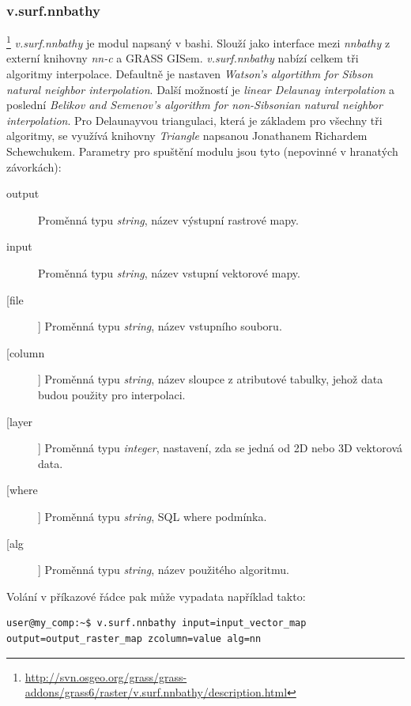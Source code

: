 \documentclass[12pt,a4paper]{article}
\begin{document}
\subsubsection{v.surf.nnbathy}\footnote{\url{http://svn.osgeo.org/grass/grass-addons/grass6/raster/v.surf.nnbathy/description.html}}
\emph{v.surf.nnbathy} je modul napsaný v bashi. Slouží jako interface mezi \emph{nnbathy} z externí knihovny \emph{nn-c} a GRASS GISem. \emph{v.surf.nnbathy} nabízí celkem tři algoritmy interpolace. Defaultně je nastaven \emph{Watson's algortithm for Sibson natural neighbor interpolation}. Další možností je \emph{linear Delaunay interpolation} a poslední \emph{Belikov and Semenov's algorithm for	non-Sibsonian natural neighbor interpolation}. Pro Delaunayvou triangulaci, která je základem pro všechny tři algoritmy, se využívá knihovny \emph{Triangle} napsanou Jonathanem Richardem Schewchukem. Parametry pro spuštění modulu jsou tyto (nepovinné v hranatých závorkách):
\begin{description}
\item[output] Proměnná typu \emph{string}, název výstupní rastrové mapy.
\item[input] Proměnná typu \emph{string}, název vstupní vektorové mapy.
\item[[file]] Proměnná typu \emph{string}, název vstupního souboru.
\item[[column]] Proměnná typu \emph{string}, název sloupce z atributové tabulky, jehož data budou použity pro interpolaci.
\item[[layer]] Proměnná typu \emph{integer}, nastavení, zda se jedná od 2D nebo 3D vektorová data.
\item[[where]] Proměnná typu \emph{string}, SQL where podmínka.
\item[[alg]] Proměnná typu \emph{string}, název použitého algoritmu.
\end{description}

\bigskip

Volání v příkazové řádce pak může vypadata například takto:
\begin{lstlisting}[caption={bash version}]
user@my_comp:~$ v.surf.nnbathy input=input_vector_map output=output_raster_map zcolumn=value alg=nn
\end{lstlisting}
\end{document}
